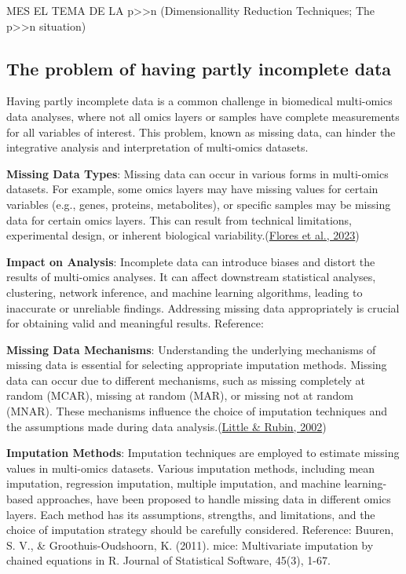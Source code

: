 \documentclass[a4paper, nobind]{templates/ociamthesis}
\begin{document}
MES EL TEMA DE LA p\textgreater\textgreater n (Dimensionallity Reduction Techniques; The p\textgreater\textgreater n situation)

\hypertarget{the-problem-of-having-partly-incomplete-data}{%
\subsection{The problem of having partly incomplete data}\label{the-problem-of-having-partly-incomplete-data}}

Having partly incomplete data is a common challenge in biomedical multi-omics data analyses, where not all omics layers or samples have complete measurements for all variables of interest. This problem, known as missing data, can hinder the integrative analysis and interpretation of multi-omics datasets.

\textbf{Missing Data Types}: Missing data can occur in various forms in multi-omics datasets. For example, some omics layers may have missing values for certain variables (e.g., genes, proteins, metabolites), or specific samples may be missing data for certain omics layers. This can result from technical limitations, experimental design, or inherent biological variability.(\protect\hyperlink{ref-flores_missing_2023}{Flores et al., 2023})

\textbf{Impact on Analysis}: Incomplete data can introduce biases and distort the results of multi-omics analyses. It can affect downstream statistical analyses, clustering, network inference, and machine learning algorithms, leading to inaccurate or unreliable findings. Addressing missing data appropriately is crucial for obtaining valid and meaningful results. Reference:

\textbf{Missing Data Mechanisms}: Understanding the underlying mechanisms of missing data is essential for selecting appropriate imputation methods. Missing data can occur due to different mechanisms, such as missing completely at random (MCAR), missing at random (MAR), or missing not at random (MNAR). These mechanisms influence the choice of imputation techniques and the assumptions made during data analysis.(\protect\hyperlink{ref-little_missing_2002}{Little \& Rubin, 2002})

\textbf{Imputation Methods}: Imputation techniques are employed to estimate missing values in multi-omics datasets. Various imputation methods, including mean imputation, regression imputation, multiple imputation, and machine learning-based approaches, have been proposed to handle missing data in different omics layers. Each method has its assumptions, strengths, and limitations, and the choice of imputation strategy should be carefully considered. Reference: Buuren, S. V., \& Groothuis-Oudshoorn, K. (2011). mice: Multivariate imputation by chained equations in R. Journal of Statistical Software, 45(3), 1-67.
\end{document}
